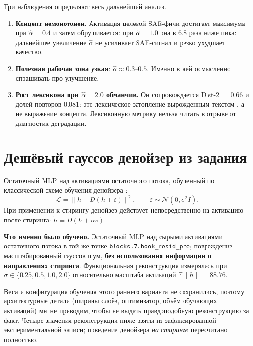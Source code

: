 \documentclass[10pt,a4paper]{article}
\newcommand{\ahat}{\hat{\alpha}}
\begin{document}
\medskip
Три наблюдения определяют весь дальнейший анализ.

\begin{enumerate}
  \item \textbf{Концепт немонотонен.} Активация целевой SAE-фичи достигает
    максимума при $\ahat = 0.4$ и затем обрушивается: при $\ahat = 1.0$ она в
    6.8 раза ниже пика: дальнейшее увеличение $\ahat$ не усиливает SAE-сигнал и
резко ухудшает качество.
  \item \textbf{Полезная рабочая зона узкая}: $\ahat \approx 0.3$--$0.5$. Именно
    в ней осмысленно спрашивать про улучшение.
  \item \textbf{Рост лексикона при $\ahat = 2.0$ обманчив.} Он сопровождается
    Dist-2 $= 0.66$ и долей повторов $0.081$: это лексическое затопление
    вырожденным текстом \cite{holtzman2020degeneration}, а не выражение
    концепта. Лексиконную метрику нельзя читать в отрыве от диагностик деградации.
\end{enumerate}

\section{Дешёвый гауссов денойзер из задания}

Остаточный MLP над активациями остаточного потока, обученный по классической
схеме обучения денойзера \cite{vincent2008denoising}:
\[
  \mathcal{L} = \lVert h - D(h + \varepsilon)\rVert^2,
  \qquad \varepsilon \sim \mathcal{N}(0, \sigma^2 I).
\]
При применении к стирингу денойзер действует непосредственно на активацию после стиринга:
$\tilde h = D(h + \alpha v)$.

\textbf{Что именно было обучено.} Остаточный MLP над сырыми активациями
остаточного потока в той же точке \texttt{blocks.7.hook\_resid\_pre};
повреждение — масштабированный гауссов шум, \textbf{без использования информации
о направлениях стиринга}. Функциональная реконструкция измерялась при
$\sigma \in \{0.25, 0.5, 1.0, 2.0\}$ относительно масштаба активаций
$\mathbb{E}\lVert h\rVert = 88.76$.

Веса и конфигурация обучения этого раннего варианта не сохранились, поэтому
архитектурные детали (ширины слоёв, оптимизатор, объём обучающих активаций) мы не
приводим, чтобы не выдать правдоподобную реконструкцию за факт. Четыре значения
реконструкции ниже взяты из зафиксированной экспериментальной записи; поведение
денойзера \emph{на стиринге} пересчитано полностью.
\end{document}
